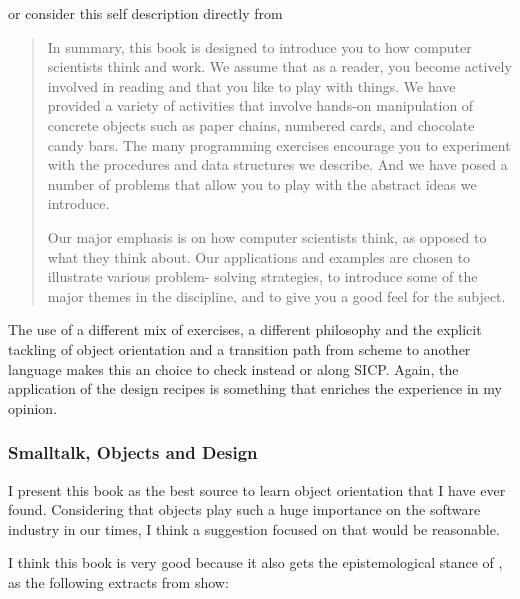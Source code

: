 or consider this self description directly from \cite{education:hailperin_conabs}

\begin{quote}
       In summary, this book is designed to introduce you to how computer scientists
    think and work. We assume that as a reader, you become actively involved in reading
    and that you like to play with things. We have provided a variety of activities that
    involve hands-on manipulation of concrete objects such as paper chains, numbered
    cards, and chocolate candy bars. The many programming exercises encourage you to
    experiment with the procedures and data structures we describe. And we have posed
    a number of problems that allow you to play with the abstract ideas we introduce.

       Our major emphasis is on how computer scientists think, as opposed to what they
    think about. Our applications and examples are chosen to illustrate various problem-
    solving strategies, to introduce some of the major themes in the discipline, and to
    give you a good feel for the subject. 
\end{quote}

The use of a different mix of exercises, a different philosophy and the explicit
tackling of object orientation and a transition path from scheme to another
language makes this an choice to check instead or along SICP. Again, the
application of the design recipes is something that enriches the experience in
my opinion.  


\subsubsection{Smalltalk, Objects and Design}

I present this book as the best source to learn object orientation that I have
ever found. Considering that objects play such a huge importance on the software
industry in our times, I think a suggestion focused on that would be reasonable.

I think this book is very good because it also gets the epistemological stance
of \cite{education:papert_mindstorms}, as the following extracts from
\cite{programming:chamond__sod} show:


